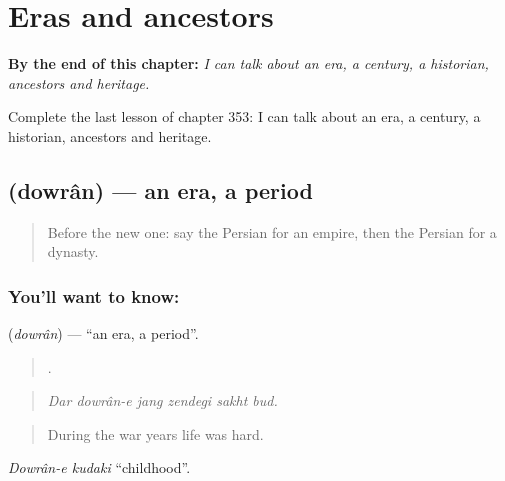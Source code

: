 
\chapter{Eras and ancestors}
\label{ch:fa-eras-and-ancestors}

\begin{chapteropening}
\textbf{By the end of this chapter:} \emph{I can talk about an era, a century, a historian, ancestors and heritage.}

Complete the last lesson of chapter 353: I can talk about an era, a century, a historian, ancestors and heritage.
\end{chapteropening}

\section[\texorpdfstring{\fa{دوران} (dowrân)}{دوران (dowrân)}]{ (dowrân) — an era, a period}

\label{lesson:FA-C353-dowran}



\begin{quote}
Before the new one: say the Persian for an empire, then the Persian for a dynasty.
\end{quote}

\subsection*{You'll want to know: }
\textbf{} (\emph{dowrân}) — \textquotedblleft{}an era, a period\textquotedblright{}.

\begin{quote}
     .
\end{quote}

\begin{quote}
\emph{Dar dowrân-e jang zendegi sakht bud.}
\end{quote}

\begin{quote}
During the war years life was hard.
\end{quote}

\emph{Dowrân-e kudaki} \textquotedblleft{}childhood\textquotedblright{}.

